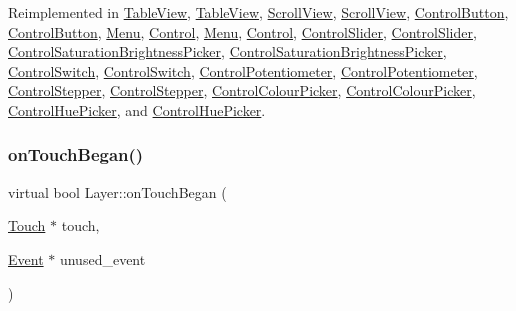 Reimplemented in \hyperlink{classTableView_a57908fcd3fe592e50ff721dd84675a01}{Table\+View}, \hyperlink{classTableView_a195a00658f0ba79be1b59935569c3c7c}{Table\+View}, \hyperlink{classScrollView_a3b24de8c28e9cfd8a2f44d626266e1be}{Scroll\+View}, \hyperlink{classScrollView_a18daa7ba9b5f802e65a6df2dde10a625}{Scroll\+View}, \hyperlink{classControlButton_a170cc0df0207fba7bc352acc6173d948}{Control\+Button}, \hyperlink{classControlButton_a1f4736ab73edd357bf9caf9fa0e1dcd6}{Control\+Button}, \hyperlink{classMenu_a2492a2fef0ccf44baf794ebc7676d986}{Menu}, \hyperlink{classControl_acdbc84186be785b6e2970c93f4252b72}{Control}, \hyperlink{classMenu_aea88e7147647b3295a5453990c47f1be}{Menu}, \hyperlink{classControl_a0cf2e20cea5b57b263e965be4a19ab52}{Control}, \hyperlink{classControlSlider_a501e9da8ef3f1dacbfb9f7a12ecb2aed}{Control\+Slider}, \hyperlink{classControlSlider_a8f6fb619bb23b4e1507f1f2bb904f808}{Control\+Slider}, \hyperlink{classControlSaturationBrightnessPicker_a8660ed765c6c5c0d8856f59aa0ba34b2}{Control\+Saturation\+Brightness\+Picker}, \hyperlink{classControlSaturationBrightnessPicker_a4de153e53cccd78b56d9dc3e18411777}{Control\+Saturation\+Brightness\+Picker}, \hyperlink{classControlSwitch_aaba407c9125d0e4cc85fb5ae59ea964c}{Control\+Switch}, \hyperlink{classControlSwitch_a67af886fe24ec32313023514b28991f3}{Control\+Switch}, \hyperlink{classControlPotentiometer_a92d549b600c44bed4fd08d5ff13cbe8e}{Control\+Potentiometer}, \hyperlink{classControlPotentiometer_ae5ab22036e6a15b6a5d388db38f29bc7}{Control\+Potentiometer}, \hyperlink{classControlStepper_a7fbb969bb376da49033a5df63f562905}{Control\+Stepper}, \hyperlink{classControlStepper_a73a5572d0e9ba2a72da9f42884e621e7}{Control\+Stepper}, \hyperlink{classControlColourPicker_aec95ec2b1f58342568c73ecd208d6a12}{Control\+Colour\+Picker}, \hyperlink{classControlColourPicker_a83493e9deb3c69dd40be99009a4759d6}{Control\+Colour\+Picker}, \hyperlink{classControlHuePicker_af178753e94f91d15e613bf0c6387af5b}{Control\+Hue\+Picker}, and \hyperlink{classControlHuePicker_ae14f5994e10b93bec6b4de027902b2a1}{Control\+Hue\+Picker}.

\mbox{\label{classLayer_af51202b4ab21e485ccc8f502103c5672}} 
\subsubsection{\texorpdfstring{on\+Touch\+Began()}{onTouchBegan()}\hspace{0.1cm}{\footnotesize\ttfamily [2/2]}}
{\footnotesize\ttfamily virtual bool Layer\+::on\+Touch\+Began (\begin{DoxyParamCaption}\item[{\hyperlink{classTouch}{Touch} $\ast$}]{touch,  }\item[{\hyperlink{classEvent}{Event} $\ast$}]{unused\+\_\+event }\end{DoxyParamCaption})\hspace{0.3cm}{\ttfamily [virtual]}}

